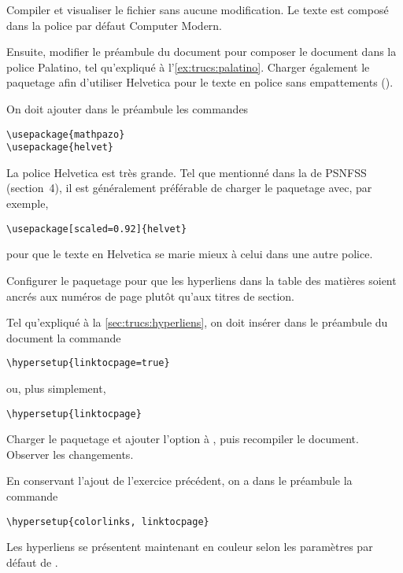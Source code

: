 \begin{exercice}
  \label{exercice:trucs:1}
  Compiler et visualiser le fichier sans aucune modification. Le texte
  est composé dans la police par défaut Computer Modern.

  Ensuite, modifier le préambule du document pour composer le document
  dans la police Palatino, tel qu'expliqué à
  l'\autoref{ex:trucs:palatino}. Charger également le paquetage
   afin d'utiliser Helvetica pour le texte en police sans
  empattements (\cmdprint{\textsf}).
  \begin{sol}
    On doit ajouter dans le préambule les commandes
\begin{lstlisting}
\usepackage{mathpazo}
\usepackage{helvet}
\end{lstlisting}
    La police Helvetica est très grande. Tel que mentionné dans la %
    de PSNFSS (section~4), il est généralement préférable de charger
    le paquetage  avec, par exemple,
\begin{lstlisting}
\usepackage[scaled=0.92]{helvet}
\end{lstlisting}
    pour que le texte en Helvetica se marie mieux à celui dans une
    autre police.
  \end{sol}
\end{exercice}

\begin{exercice}
  Configurer le paquetage  pour que les hyperliens dans
  la table des matières soient ancrés aux numéros de page plutôt
  qu'aux titres de section.
  \begin{sol}
    Tel qu'expliqué à la \autoref{sec:trucs:hyperliens}, on doit
    insérer dans le préambule du document la commande
\begin{lstlisting}
\hypersetup{linktocpage=true}
\end{lstlisting}
    ou, plus simplement,
\begin{lstlisting}
\hypersetup{linktocpage}
\end{lstlisting}
  \end{sol}
\end{exercice}

\begin{exercice}
  Charger le paquetage  et ajouter l'option
   à , puis recompiler le document.
  Observer les changements.
  \begin{sol}
    En conservant l'ajout de l'exercice précédent, on a dans le
    préambule la commande
\begin{lstlisting}
\hypersetup{colorlinks, linktocpage}
\end{lstlisting}
    Les hyperliens se présentent maintenant en couleur selon les
    paramètres par défaut de .
  \end{sol}
\end{exercice}


